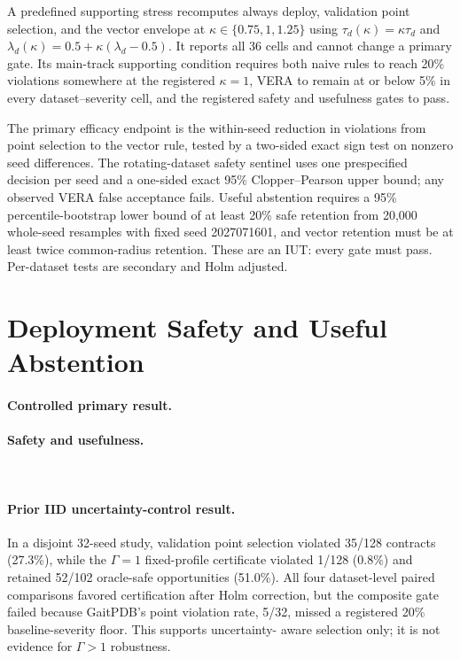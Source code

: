 A predefined supporting stress recomputes always deploy, validation point
selection, and the vector envelope at
$\kappa\in\{0.75,1,1.25\}$ using
$\tau_d(\kappa)=\kappa\tau_d$ and
$\lambda_d(\kappa)=0.5+\kappa(\lambda_d-0.5)$. It reports all 36 cells and
cannot change a primary gate. Its main-track supporting condition requires
both naive rules to reach 20\% violations somewhere at the registered
$\kappa=1$, VERA to remain at or below 5\% in every dataset--severity cell,
and the registered safety and usefulness gates to pass.

The primary efficacy endpoint is the within-seed reduction in violations from
point selection to the vector rule, tested by a two-sided exact sign test on
nonzero seed differences. The rotating-dataset safety sentinel uses one
prespecified decision per seed and a one-sided exact 95\% Clopper--Pearson upper
bound; any observed VERA false acceptance fails. Useful abstention requires a
95\% percentile-bootstrap lower bound of at least 20\% safe retention from
20,000 whole-seed resamples with fixed seed 2027071601, and vector retention
must be at least twice common-radius retention. These are an IUT: every gate
must pass. Per-dataset tests are secondary and Holm adjusted.

\section{Deployment Safety and Useful Abstention}
\label{iclr:sec:results}

\paragraph{Controlled primary result.}
\ControlledPrimaryResult

\paragraph{Safety and usefulness.}
\ControlledSafetyResult\ \ControlledRetentionResult

\ControlledMainResultTable
\ControlledMainResultFigure

\paragraph{Prior IID uncertainty-control result.}
In a disjoint 32-seed study, validation point selection violated 35/128
contracts (27.3\%), while the $\Gamma=1$ fixed-profile certificate violated
1/128 (0.8\%) and retained 52/102 oracle-safe opportunities (51.0\%). All four
dataset-level paired comparisons favored certification after Holm correction,
but the composite gate failed because GaitPDB's point violation rate, 5/32,
missed a registered 20\% baseline-severity floor. This supports uncertainty-
aware selection only; it is not evidence for $\Gamma>1$ robustness.

